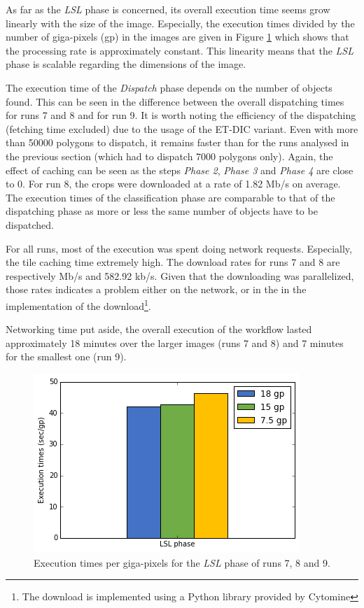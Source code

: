 As far as the \textit{LSL} phase is concerned, its overall execution time seems grow linearly with the size of the image. Especially, the execution times divided by the number of giga-pixels (gp) in the images are given in Figure \ref{fig:perf_lsl_sec_gp} which shows that the processing rate is approximately constant. This linearity means that the \textit{LSL} phase is scalable regarding the dimensions of the image.

The execution time of the \textit{Dispatch} phase depends on the number of objects found. This can be seen in the difference between the overall dispatching times for runs 7 and 8 and for run 9. It is worth noting the efficiency of the dispatching (fetching time excluded) due to the usage of the ET-DIC variant. Even with more than 50000 polygons to dispatch, it remains faster than for the runs analysed in the previous section (which had to dispatch 7000 polygons only). Again, the effect of caching can be seen as the steps \textit{Phase 2}, \textit{Phase 3} and \textit{Phase 4} are close to 0. For run 8, the crops were downloaded at a rate of 1.82 Mb/s on average. The execution times of the classification phase are comparable to that of the dispatching phase as more or less the same number of objects have to be dispatched.

For all runs, most of the execution was spent doing network requests. Especially, the tile caching time extremely high. The download rates for runs 7 and 8 are respectively Mb/s and 582.92 kb/s. Given that the downloading was parallelized, those rates indicates a problem either on the network, or in the in the implementation of the download\footnote{The download is implemented using a Python library provided by Cytomine}.

Networking time put aside, the overall execution of the workflow lasted approximately 18 minutes over the larger images (runs 7 and 8) and 7 minutes for the smallest one (run 9). 

\begin{figure}
	\center
	\includegraphics[scale=0.5]{image/perf_lsl_sec_gp.png}
	\caption{Execution times per giga-pixels for the \textit{LSL} phase of runs 7, 8 and 9.}
	\label{fig:perf_lsl_sec_gp}
\end{figure}

